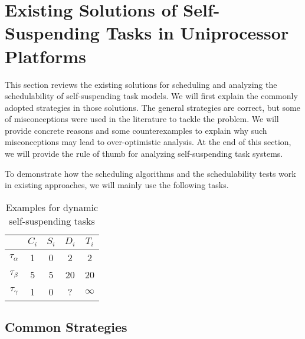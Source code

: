 \section{Existing Solutions of Self-Suspending Tasks in Uniprocessor Platforms}

This section reviews the existing solutions for scheduling and analyzing the schedulability of self-suspending task models. We will first explain the commonly adopted strategies in those solutions. The general strategies are correct, but some of misconceptions were used in the literature to tackle the problem. We will provide concrete reasons and some counterexamples to explain why such misconceptions may lead to over-optimistic analysis. At the end of this section, we will provide the rule of thumb for analyzing self-suspending task systems. 

To demonstrate how the scheduling algorithms and the schedulability tests work in existing approaches, we will mainly use the following tasks. 
\begin{table} 
    \begin{tabular}{|c|c|c|c|c|}
        & $C_i$ &  $S_i$&  $D_i$ & $T_i$\\ 
        \hline
        $\tau_\alpha$ & 1 & 0 &  2 & 2\\ 
        $\tau_\beta$ &  5&  5& 20 & 20 \\ 
        $\tau_\gamma$ & 1 & 0  & ? & $\infty$ \\ 
        \hline
    \end{tabular} 
    \caption{Examples for dynamic self-suspending tasks}
\end{table}

\begin{table} 
    \caption{Examples for dynamic segmented-suspending tasks}
\end{table}


\subsection{Common Strategies}

